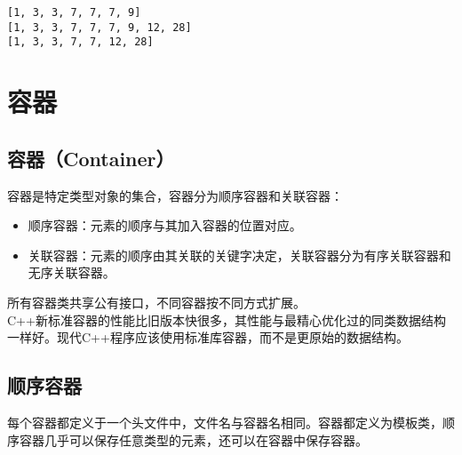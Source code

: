 \begin{tcolorbox}
	\begin{verbatim}
[1, 3, 3, 7, 7, 7, 9] 
[1, 3, 3, 7, 7, 7, 9, 12, 28]
[1, 3, 3, 7, 7, 12, 28]
	\end{verbatim}
\end{tcolorbox}

\newpage

\section{容器}

\subsection{容器（Container）}

容器是特定类型对象的集合，容器分为顺序容器和关联容器：

\begin{itemize}
	\item 顺序容器：元素的顺序与其加入容器的位置对应。
	\item 关联容器：元素的顺序由其关联的关键字决定，关联容器分为有序关联容器和无序关联容器。
\end{itemize}

所有容器类共享公有接口，不同容器按不同方式扩展。\\

C++新标准容器的性能比旧版本快很多，其性能与最精心优化过的同类数据结构一样好。现代C++程序应该使用标准库容器，而不是更原始的数据结构。\\

\subsection{顺序容器}

每个容器都定义于一个头文件中，文件名与容器名相同。容器都定义为模板类，顺序容器几乎可以保存任意类型的元素，还可以在容器中保存容器。

\begin{table}[H]
	\centering
	\caption{顺序容器}
\end{table}

